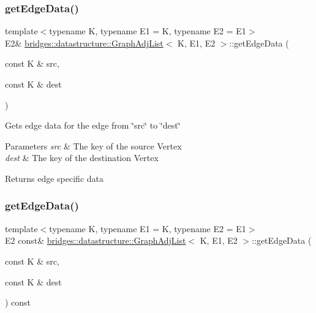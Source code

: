 \subsubsection{\texorpdfstring{get\+Edge\+Data()}{getEdgeData()}\hspace{0.1cm}{\footnotesize\ttfamily [1/2]}}
{\footnotesize\ttfamily template$<$typename K, typename E1 = K, typename E2 = E1$>$ \\
E2\& \hyperlink{classbridges_1_1datastructure_1_1_graph_adj_list}{bridges\+::datastructure\+::\+Graph\+Adj\+List}$<$ K, E1, E2 $>$\+::get\+Edge\+Data (\begin{DoxyParamCaption}\item[{const K \&}]{src,  }\item[{const K \&}]{dest }\end{DoxyParamCaption})\hspace{0.3cm}{\ttfamily [inline]}}

Gets edge data for the edge from \char`\"{}src\char`\"{} to \char`\"{}dest\char`\"{}


\begin{DoxyParams}{Parameters}
{\em src} & The key of the source Vertex \\
\hline
{\em dest} & The key of the destination Vertex\\
\hline
\end{DoxyParams}
\begin{DoxyReturn}{Returns}
edge specific data 
\end{DoxyReturn}
\mbox{\label{classbridges_1_1datastructure_1_1_graph_adj_list_a5c2cdffda7c983c3141ae36acc2b698d}} 
\subsubsection{\texorpdfstring{get\+Edge\+Data()}{getEdgeData()}\hspace{0.1cm}{\footnotesize\ttfamily [2/2]}}
{\footnotesize\ttfamily template$<$typename K, typename E1 = K, typename E2 = E1$>$ \\
E2 const\& \hyperlink{classbridges_1_1datastructure_1_1_graph_adj_list}{bridges\+::datastructure\+::\+Graph\+Adj\+List}$<$ K, E1, E2 $>$\+::get\+Edge\+Data (\begin{DoxyParamCaption}\item[{const K \&}]{src,  }\item[{const K \&}]{dest }\end{DoxyParamCaption}) const\hspace{0.3cm}{\ttfamily [inline]}}

